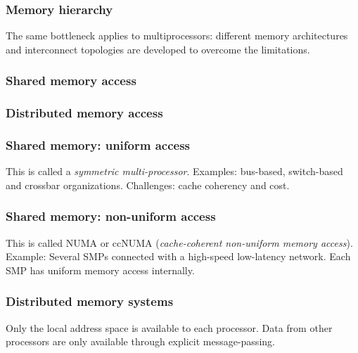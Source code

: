 \begin{frame}
  \frametitle{Memory hierarchy}
  \begin{center}
    \scalebox{0.8}{
      
    }
  \end{center}

The same bottleneck applies to multiprocessors: different memory architectures and interconnect topologies are developed to overcome the limitations.

\end{frame}

\begin{frame}
  \frametitle{Shared memory access}
  \begin{center}
    
  \end{center}
\end{frame}

\begin{frame}
  \frametitle{Distributed memory access}
  \begin{center}
    
  \end{center}
\end{frame}

\begin{frame}
  \frametitle{Shared memory: uniform access}
  This is called a \emph{symmetric multi-processor}. Examples: bus-based,
  switch-based and crossbar organizations. Challenges: cache coherency and cost.
  \begin{center}
    \scalebox{0.6}{}
  \end{center}
\end{frame}

\begin{frame}
  \frametitle{Shared memory: non-uniform access}
  This is called NUMA or ccNUMA (\emph{cache-coherent non-uniform memory
    access}). Example: Several SMPs connected with a high-speed low-latency
  network. Each SMP has uniform memory access internally.
  \begin{center}
    
  \end{center}
\end{frame}

\begin{frame}
  \frametitle{Distributed memory systems}
  Only the local address space is available to each processor. Data from other
  processors are only available through explicit message-passing.
  \begin{center}
    
  \end{center}
\end{frame}

